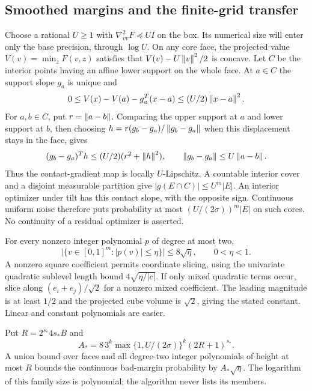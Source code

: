 \subsection{Smoothed margins and the finite-grid transfer}

Choose a rational $U\ge1$ with $\nabla^2_{vv}F\preceq UI$ on the
box. Its numerical size will enter only the base precision, through
$\log U$. On any core face, the projected value
$V(v)=\min_zF(v,z)$ satisfies that $V(v)-U\left\lVert v\right\rVert^2/2$ is concave.
Let $C$ be the interior points having an affine lower support on the
whole face. At $a\in C$ the support slope $g_a$ is unique and
\[
 0\le V(x)-V(a)-g_a^T(x-a)\le(U/2)\left\lVert x-a\right\rVert^2.
\]
For $a,b\in C$, put $r=\left\lVert a-b\right\rVert$. Comparing the upper support at
$a$ and lower support at $b$, then choosing
$h=r(g_b-g_a)/\left\lVert g_b-g_a\right\rVert$ when this displacement stays in the
face, gives
\[
 (g_b-g_a)^Th\le(U/2)(r^2+\left\lVert h\right\rVert^2),
 \qquad \left\lVert g_b-g_a\right\rVert\le U\left\lVert a-b\right\rVert.
\]
Thus the contact-gradient map is locally $U$-Lipschitz. A countable
interior cover and a disjoint measurable partition give
$|g(E\cap C)|\le U^m|E|$. An interior optimizer under tilt has this
contact slope, with the opposite sign. Continuous uniform noise
therefore puts probability at most $(U/(2\sigma))^m|E|$ on such cores.
No continuity of a residual optimizer is asserted.

For every nonzero integer polynomial $p$ of degree at most two,
\begin{equation}
 \bigl|\{v\in[0,1]^m:|p(v)|\le\eta\}\bigr|
 \le8\sqrt\eta,\qquad 0<\eta<1.
 \label{eq:recourse-sublevel}
\end{equation}
A nonzero square coefficient permits coordinate slicing, using the
univariate quadratic sublevel length bound $4\sqrt{\eta/|c|}$.
If only mixed quadratic terms occur, slice along
$(e_i+e_j)/\sqrt2$ for a nonzero mixed coefficient. The leading
magnitude is at least $1/2$ and the projected cube volume is
$\sqrt2$, giving the stated constant. Linear and constant polynomials
are easier.

Put $R=2^{s_*}4s_*B$ and
\[
 A_*=8\,3^k\max\{1,U/(2\sigma)\}^k(2R+1)^{s_*}.
\]
A union bound over faces and all degree-two integer polynomials of
height at most $R$ bounds the continuous bad-margin probability by
$A_*\sqrt\eta$. The logarithm of this family size is polynomial;
the algorithm never lists its members.

